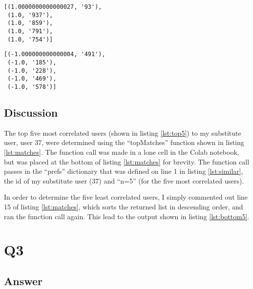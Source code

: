 \documentclass[12pt]{article}
\begin{document}
\begin{lstlisting}[caption=Output of top 5 users after call to topMatches function using the prefs dictionary and user 37., label=lst:top5]
[(1.0000000000000027, '93'),
 (1.0, '937'),
 (1.0, '859'),
 (1.0, '791'),
 (1.0, '754')]
\end{lstlisting}

\begin{lstlisting}[caption=Output of bottom 5 users after call to topMatches function using the prefs dictionary and user 37., label=lst:bottom5]
[(-1.000000000000004, '491'),
 (-1.0, '185'),
 (-1.0, '228'),
 (-1.0, '469'),
 (-1.0, '578')]
\end{lstlisting}

\subsection*{Discussion}
The top five most correlated users (shown in listing \ref{lst:top5}) to my substitute user, user 37, were determined using the ``topMatches'' function shown in listing \ref{lst:matches}.  The function call was made in a lone cell in the Colab notebook, but was placed at the bottom of listing \ref{lst:matches} for brevity.  The function call passes in the ``prefs'' dictionary that was defined on line 1 in listing \ref{lst:similar}, the id of my substitute user (37) and ``n=5'' (for the five most correlated users).

In order to determine the five least correlated users, I simply commented out line 15 of listing \ref{lst:matches}, which sorts the returned list in descending order, and ran the function call again.  This lead to the output shown in listing \ref{lst:bottom5}.

\section*{Q3}

\subsection*{Answer}
\end{document}
